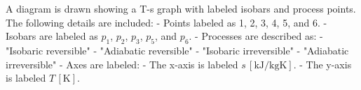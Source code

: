 A diagram is drawn showing a T-s graph with labeled isobars and process points. The following details are included:  
- Points labeled as 1, 2, 3, 4, 5, and 6.  
- Isobars are labeled as \( p_1 \), \( p_2 \), \( p_3 \), \( p_5 \), and \( p_6 \).  
- Processes are described as:  
  - "Isobaric reversible"  
  - "Adiabatic reversible"  
  - "Isobaric irreversible"  
  - "Adiabatic irreversible"  
- Axes are labeled:  
  - The x-axis is labeled \( s \, [\text{kJ/kgK}] \).  
  - The y-axis is labeled \( T \, [\text{K}] \).